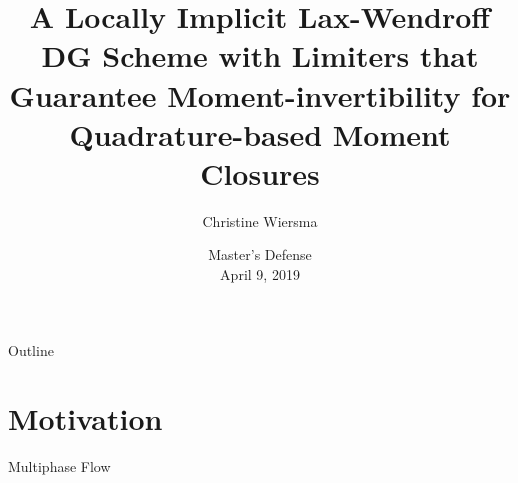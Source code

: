 \documentclass[11pt]{beamer}
\title[Master's Defense]{A Locally Implicit Lax-Wendroff DG Scheme with Limiters that Guarantee Moment-invertibility for Quadrature-based Moment Closures}
\author[Christine Wiersma]{Christine Wiersma}
\institute[Iowa State University]{Iowa State University \\ Department of Mathematics\\ Advisor: James Rossmanith}
\date[April 9, 2019]{Master's Defense \\ April 9, 2019}
\begin{document}
\begin{frame}
\maketitle
\end{frame}


\begin{frame}{Outline}
\tableofcontents
\end{frame}


\section{Motivation}


\begin{frame}{Multiphase Flow}




\end{frame}
\end{document}

